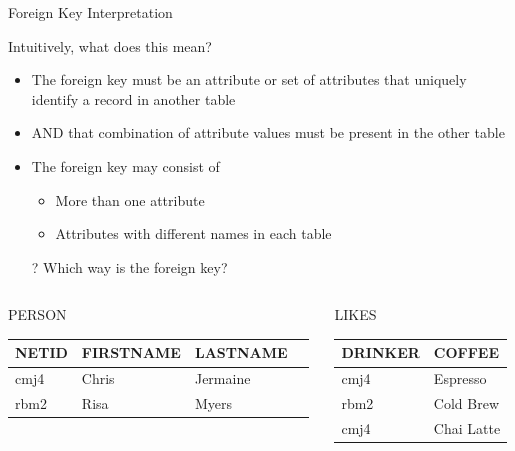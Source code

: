 \documentclass[aspectratio=169]{beamer}
\begin{document}
\begin{frame}{Foreign Key Interpretation}

Intuitively, what does this mean?
\begin{itemize}
\item The foreign key must be an attribute or set of attributes that uniquely identify a record in another table
\item AND that combination of attribute values must be present in the other table
\item The foreign key may consist of
	\begin{itemize}
	\item More than one attribute
	\item Attributes with different names in each table
	\end{itemize}
\vspace{2em}
\item[?] Which way is the foreign key?
\end{itemize}
\vspace{2em}
{\scriptsize
\begin{columns}
\begin{column}{0.5\textwidth}
PERSON\\
\begin{tabular}{|l|l|l|l| }  \hline
\textrm{NETID} & \textrm{FIRSTNAME}& \textrm{LASTNAME}\\ \hline
{\color{red}cmj4} & Chris & Jermaine  \\ \hline
{\color{blue}rbm2} & Risa & Myers\\ \hline
\end{tabular}\\

\end{column}
\begin{column}{0.5\textwidth}
LIKES\\
\begin{tabular}{|l|l|}  \hline
\textrm{DRINKER} & \textrm{COFFEE}\\ \hline
{\color{red}cmj4} & Espresso  \\ \hline
{\color{blue}rbm2}  & Cold Brew \\ \hline
{\color{red}cmj4} & Chai Latte  \\ \hline
\end{tabular}\\
\end{column}
\end{columns}
}
\end{frame}
\end{document}
